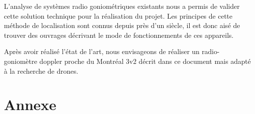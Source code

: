 \documentclass[a4paper, 11pt, oneside]{memoir}
\newcounter{th}[chapter]
\begin{document}
L'analyse de systèmes radio goniométriques existants nous a permis de valider cette solution technique pour la réalisation du projet. Les principes de cette méthode de localisation sont connus depuis près d'un siècle, il est donc aisé de trouver des ouvrages décrivant le mode de fonctionnements de ces appareils.

Après avoir réalisé l'état de l'art, nous envisageons de réaliser un radio-goniomètre doppler proche du Montréal 3v2 décrit dans ce document mais adapté à la recherche de drones.   

\newpage


\part*{Annexe}
\appendix
\nocite{*}



\newpage
\listoffigures
\printindex


\end{document}
